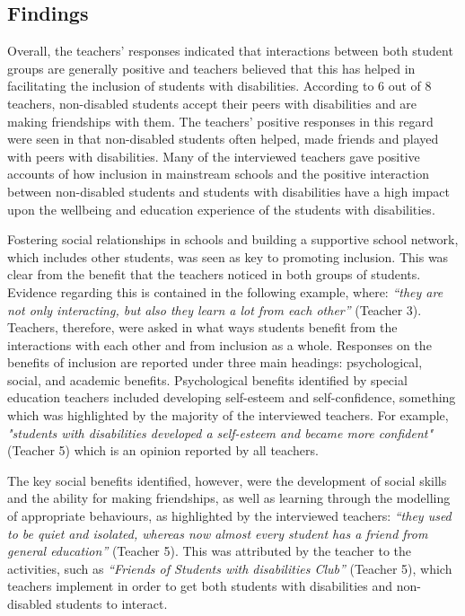 \documentclass[11pt]{sig-alternate}
\begin{document}
\begin{large}
{\section*{Findings}
Overall, the teachers’ responses indicated that interactions between both student groups are generally positive and teachers believed that this has helped in facilitating the inclusion of students with disabilities. According to 6 out of 8 teachers, non-disabled students accept their peers with disabilities and are making friendships with them. The teachers’ positive responses in this regard were seen in that non-disabled students often helped, made friends and played with peers with disabilities. Many of the interviewed teachers gave positive accounts of how inclusion in mainstream schools and the positive interaction between non-disabled students and students with disabilities have a high impact upon the wellbeing and education experience of the students with disabilities.

 Fostering social relationships in schools and building a supportive school network, which includes other students, was seen as key to promoting inclusion. This was clear from the benefit that the teachers noticed in both groups of students. Evidence regarding this is contained in the following example, where: \textit{“they are not only interacting, but also they learn a lot from each other”} (Teacher 3). Teachers, therefore, were asked in what ways students benefit from the interactions with each other and from inclusion as a whole. Responses on the benefits of inclusion are reported under three main headings: psychological, social, and academic benefits. Psychological benefits identified by special education teachers included developing self-esteem and self-confidence, something which was highlighted by the majority of the interviewed teachers. For example, \textit{"students with disabilities developed a self-esteem and became more confident"} (Teacher 5) which is an opinion reported by all teachers.  
 
The key social benefits identified, however, were the development of social skills and the ability for making friendships, as well as learning through the modelling of appropriate behaviours, as highlighted by the interviewed teachers: \textit{“they used to be quiet and isolated, whereas now almost every student has a friend from general education”} (Teacher 5). This was attributed by the teacher to the activities, such as \textit{“Friends of Students with disabilities Club”} (Teacher 5), which teachers implement in order to get both students with disabilities and non-disabled students to interact. 

}
\end{large}
\end{document}
